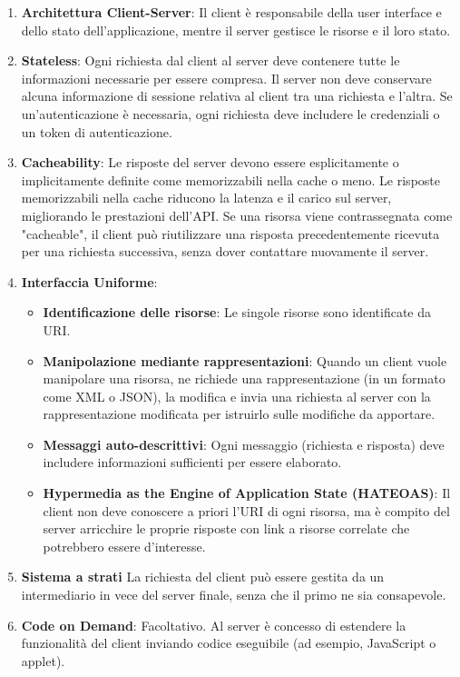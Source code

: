 \begin{enumerate}
  \item \textbf{Architettura Client-Server}: Il client è responsabile della user interface e dello stato dell'applicazione, mentre il server gestisce le risorse e il loro stato.
	\item \textbf{Stateless}: Ogni richiesta dal client al server deve contenere tutte le informazioni necessarie per essere compresa. Il server non deve conservare alcuna informazione di sessione relativa al client tra una richiesta e l'altra. Se un'autenticazione è necessaria, ogni richiesta deve includere le credenziali o un token di autenticazione.
	\item \textbf{Cacheability}: Le risposte del server devono essere esplicitamente o implicitamente definite come memorizzabili nella cache o meno. Le risposte memorizzabili nella cache riducono la latenza e il carico sul server, migliorando le prestazioni dell'API. Se una risorsa viene contrassegnata come "cacheable", il client può riutilizzare una risposta precedentemente ricevuta per una richiesta successiva, senza dover contattare nuovamente il server.
	\item \textbf{Interfaccia Uniforme}:
	\begin{itemize}
		\item \textbf{Identificazione delle risorse}: Le singole risorse sono identificate da URI.
		\item \textbf{Manipolazione mediante rappresentazioni}: Quando un client vuole manipolare una risorsa, ne richiede una rappresentazione (in un formato come XML o JSON), la modifica e invia una richiesta al server con la rappresentazione modificata per istruirlo sulle modifiche da apportare.
		\item \textbf{Messaggi auto-descrittivi}: Ogni messaggio (richiesta e risposta) deve includere informazioni sufficienti per essere elaborato.
		\item \textbf{Hypermedia as the Engine of Application State (HATEOAS)}: Il client non deve conoscere a priori l'URI di ogni risorsa, ma è compito del server arricchire le proprie risposte con link a risorse correlate che potrebbero essere d'interesse.
	\end{itemize}
	\item \textbf{Sistema a strati} La richiesta del client può essere gestita da un intermediario in vece del server finale, senza che il primo ne sia consapevole.
	\item \textbf{Code on Demand}: Facoltativo. Al server è concesso di estendere la funzionalità del client inviando codice eseguibile (ad esempio, JavaScript o applet).
\end{enumerate}


